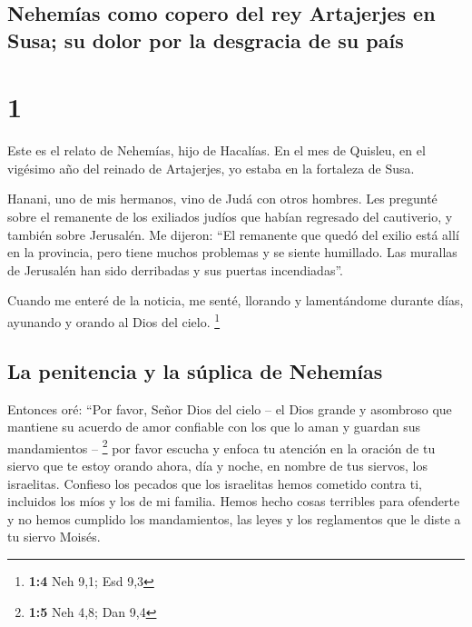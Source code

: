 \hypertarget{nehemuxedas-como-copero-del-rey-artajerjes-en-susa-su-dolor-por-la-desgracia-de-su-pauxeds}{%
\subsection{Nehemías como copero del rey Artajerjes en Susa; su dolor
por la desgracia de su
país}\label{nehemuxedas-como-copero-del-rey-artajerjes-en-susa-su-dolor-por-la-desgracia-de-su-pauxeds}}

\hypertarget{section}{%
\section{1}\label{section}}

 Este es el relato de Nehemías, hijo de Hacalías. En el
mes de Quisleu, en el vigésimo año del reinado de Artajerjes, yo estaba
en la fortaleza de Susa.

 Hanani, uno de mis hermanos, vino de Judá con otros
hombres. Les pregunté sobre el remanente de los exiliados judíos que
habían regresado del cautiverio, y también sobre Jerusalén.
 Me dijeron: ``El remanente que quedó del exilio está allí
en la provincia, pero tiene muchos problemas y se siente humillado. Las
murallas de Jerusalén han sido derribadas y sus puertas incendiadas''.

 Cuando me enteré de la noticia, me senté, llorando y
lamentándome durante días, ayunando y orando al Dios del cielo.
\footnote{\textbf{1:4} Neh 9,1; Esd 9,3}

\hypertarget{la-penitencia-y-la-suxfaplica-de-nehemuxedas}{%
\subsection{La penitencia y la súplica de
Nehemías}\label{la-penitencia-y-la-suxfaplica-de-nehemuxedas}}

 Entonces oré: ``Por favor, Señor Dios del cielo -- el
Dios grande y asombroso que mantiene su acuerdo de amor confiable con
los que lo aman y guardan sus mandamientos -- \footnote{\textbf{1:5} Neh
  4,8; Dan 9,4}  por favor escucha y enfoca tu atención en
la oración de tu siervo que te estoy orando ahora, día y noche, en
nombre de tus siervos, los israelitas. Confieso los pecados que los
israelitas hemos cometido contra ti, incluidos los míos y los de mi
familia.  Hemos hecho cosas terribles para ofenderte y no
hemos cumplido los mandamientos, las leyes y los reglamentos que le
diste a tu siervo Moisés.

